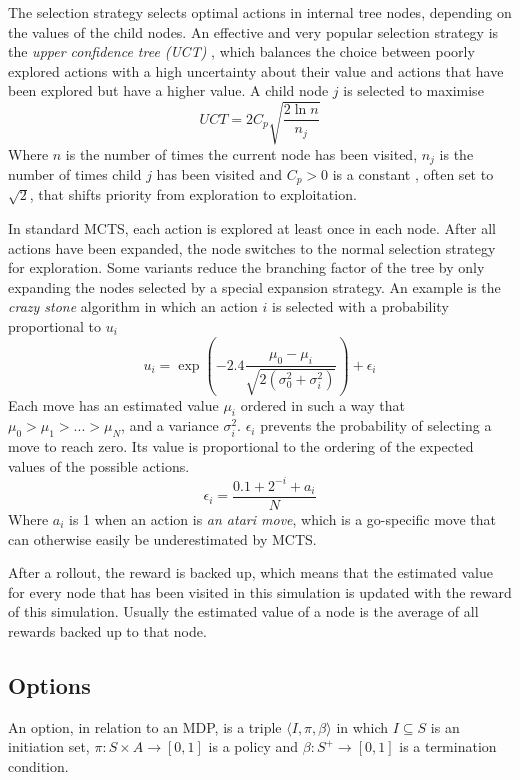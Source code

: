 The selection strategy selects optimal actions in internal tree nodes, depending
on the values of the child nodes. An effective and very popular selection
strategy is the \emph{upper confidence tree (UCT)} \cite{kocsis2006bandit}, which balances the choice 
between poorly explored actions with a high uncertainty about their value and
actions that have been explored but have a higher value. A child node $j$ is
selected to maximise
$$UCT = 2C_p \sqrt{\frac{2 \ln n}{n_j}}$$
Where $n$ is the number of times the current node has been visited, $n_j$ is the
number of times child $j$ has been visited and $C_p > 0$ is a constant , often
set to $\sqrt{2}$, that shifts priority from exploration to exploitation.
	
In standard MCTS, each action is explored at least once in each node. After all
actions have been expanded, the node switches to the normal selection strategy
for exploration. Some variants reduce the branching factor of the tree by only
expanding the nodes selected by a special expansion strategy. An example is the
\emph{crazy stone} algorithm \cite{coulom2007efficient} in which an action $i$ is selected with a
probability proportional to $u_i$
$$u_i = \exp\left(-2.4\frac{\mu_0 - \mu_i}{\sqrt{2\left(\sigma_0^2 +
\sigma_i^2\right)}}\right) + \epsilon_i$$
Each move has an estimated value $\mu_i$ ordered in such a way that $\mu_0 >
\mu_1 > ... > \mu_N$, and a variance $\sigma_i^2$. $\epsilon_i$ prevents 
the probability of selecting a move to reach zero. Its value is proportional to
the ordering of the expected values of the possible actions.
$$\epsilon_i = \frac{0.1 + 2^{-i} + a_i}{N}$$
Where $a_i$ is 1 when an action is \emph{an atari move}, which is a go-specific
move that can otherwise easily be underestimated by MCTS.

After a rollout, the reward is backed up, which means that the estimated value
for every node that has been visited in this simulation is updated with the
reward of this simulation. Usually the estimated value of a node is the average
of all rewards backed up to that node.

\subsection{Options}
\label{subsec:options}
An option, in relation to an MDP, is a triple $\langle I, \pi, \beta\rangle$ in
which $I \subseteq S$ is an initiation set, $\pi: S \times A \rightarrow [0, 1]$
is a policy and $\beta: S^+ \rightarrow[0,1]$ is a termination
condition. \cite{sutton1999between}

